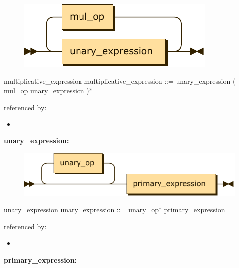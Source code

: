 \documentclass[10pt,a4paper,twoside]{article}
\providecommand{\tightlist}{%
  \setlength{\itemsep}{0pt}\setlength{\parskip}{0pt}}
\newcounter{grammarbox}[section]
\begin{document}
\begin{figure}[H]
\centering
\includegraphics{diagram/multiplicative_expression.pdf}

\end{figure}

\begin{grammarbox}{multiplicative\_expression}
\vspace{0.5em}
multiplicative\_expression
         ::= unary\_expression ( mul\_op unary\_expression )*
\end{grammarbox}

referenced by:

\begin{itemize}
\tightlist
\item
\end{itemize}

\textbf{unary\_expression:}

\begin{figure}[H]
\centering
\includegraphics{diagram/unary_expression.pdf}

\end{figure}

\begin{grammarbox}{unary\_expression}
\vspace{0.5em}
unary\_expression
         ::= unary\_op* primary\_expression
\end{grammarbox}

referenced by:

\begin{itemize}
\tightlist
\item
\end{itemize}

\textbf{primary\_expression:}
\end{document}
